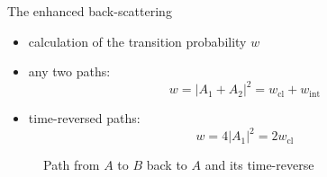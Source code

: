 \documentclass[1pt]{beamer}
\begin{document}
\begin{frame}{The enhanced back-scattering}
\begin{minipage}[c]{0.38\textwidth}
\begin{itemize}
\item calculation of the transition probability $w$
\vspace{5mm}
\item any two paths:
$$w=|A_1 + A_2|^2=w_\mathrm{cl} + w_\mathrm{int}$$
\vspace{5mm}
\item time-reversed paths:
$$w=4|A_1 |^2=2w_\mathrm{cl}$$
\end{itemize}
\end{minipage}\hfill
\begin{minipage}[c]{0.5\textwidth}
\begin{figure}
\caption{Path from $A$ to $B$ back to $A$ and its time-reverse}
\end{figure}
\end{minipage}
\end{frame}

\end{document}
